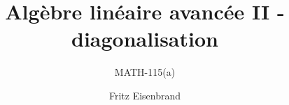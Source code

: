 \documentclass[aspectratio=169,xcolor=dvipsnames,noframenumbering,frenchyn]{beamer}
\title{Algèbre linéaire avancée II - diagonalisation}
\subtitle{ MATH-115(a) }
\author[Eisenbrand]{Fritz Eisenbrand}
\date{}
\begin{document}
\begin{frame}[plain]
    \titlepage
\end{frame}



\pagestyle{empty} 

 
 
\end{document}
